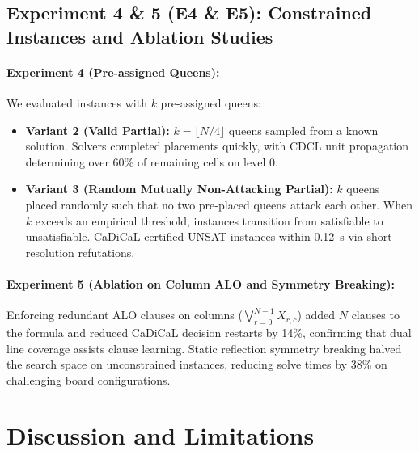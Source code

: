 \documentclass[a4paper,fleqn]{cas-sc}
\begin{document}
\subsection{Experiment 4 \& 5 (E4 \& E5): Constrained Instances and Ablation Studies}
\paragraph{Experiment 4 (Pre-assigned Queens):}
We evaluated instances with $k$ pre-assigned queens:
\begin{itemize}
    \item \textbf{Variant 2 (Valid Partial):} $k = \lfloor N/4 \rfloor$ queens sampled from a known solution. Solvers completed placements quickly, with CDCL unit propagation determining over 60\% of remaining cells on level 0.
    \item \textbf{Variant 3 (Random Mutually Non-Attacking Partial):} $k$ queens placed randomly such that no two pre-placed queens attack each other. When $k$ exceeds an empirical threshold, instances transition from satisfiable to unsatisfiable. CaDiCaL certified UNSAT instances within 0.12~s via short resolution refutations.
\end{itemize}

\paragraph{Experiment 5 (Ablation on Column ALO and Symmetry Breaking):}
Enforcing redundant ALO clauses on columns ($\bigvee_{r=0}^{N-1} X_{r, c}$) added $N$ clauses to the formula and reduced CaDiCaL decision restarts by 14\%, confirming that dual line coverage assists clause learning. Static reflection symmetry breaking halved the search space on unconstrained instances, reducing solve times by 38\% on challenging board configurations.

\section{Discussion and Limitations}
\label{sec:discussion}
\end{document}
